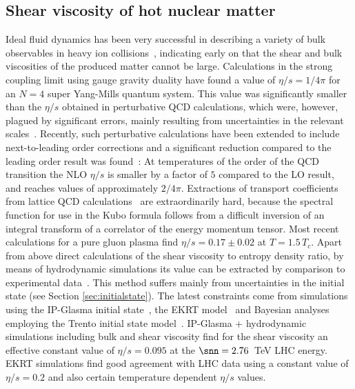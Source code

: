 \subsection{Shear viscosity of hot nuclear matter\label{sec:macro}}
Ideal fluid dynamics has been very successful in describing a variety of 
  bulk observables in heavy ion collisions~\cite{Kolb:2003dz,Huovinen:2003fa,Hirano:2002ds}, 
  indicating early on that the shear and bulk viscosities of the produced 
  matter cannot be large. 
Calculations in the strong coupling limit using gauge gravity duality have 
  found a value of $\eta/s=1/4\pi$ for an $N = 4$ super Yang-Mills 
  quantum system. 
This value was significantly smaller than the $\eta/s$ obtained in 
  perturbative QCD calculations, which were, however, plagued by 
  significant errors, mainly resulting from uncertainties in the 
  relevant scales~\cite{Arnold:2003zc}. 
Recently, such perturbative calculations have been extended to include 
  next-to-leading order corrections and a significant reduction compared 
  to the leading order result was found~\cite{Ghiglieri:2018dgf}: 
At temperatures of the order of the QCD transition the NLO $\eta/s$ 
  is smaller by a factor of $5$ compared to the LO result, and reaches 
  values of approximately $2/4\pi$. 
Extractions of transport coefficients from lattice QCD calculations~\cite{Nakamura:2004sy,Meyer:2007ic,Pasztor:2018yae} 
  are extraordinarily hard, because the spectral function for use in 
  the Kubo formula follows from a difficult inversion of an integral 
  transform of a correlator of the energy momentum tensor. 
Most recent calculations for a pure gluon plasma find $\eta/s=0.17\pm 0.02$ at $T=1.5\,T_c$.
Apart from above direct calculations of the shear viscosity to entropy 
  density ratio, by means of hydrodynamic simulations its value can be 
  extracted by comparison to experimental data~\cite{Gale:2013da,Heinz:2013th}. 
This method suffers mainly from uncertainties in the initial state (see Section \ref{sec:initialstate}). 
The latest constraints come from simulations using the IP-Glasma initial 
  state~\cite{Schenke:2012wb,Schenke:2012fw}, the EKRT model~\cite{Niemi:2015qia} 
  and Bayesian analyses employing the Trento initial state model~\cite{Moreland:2018gsh}. 
IP-Glasma + hydrodynamic simulations including bulk and shear viscosity 
  find for the shear viscosity an effective constant value of $\eta/s=0.095$ 
  at the $\snn=2.76$~TeV LHC energy. %
EKRT simulations find good agreement with LHC data using a constant value 
  of $\eta/s=0.2$ and also certain temperature dependent $\eta/s$ values.
